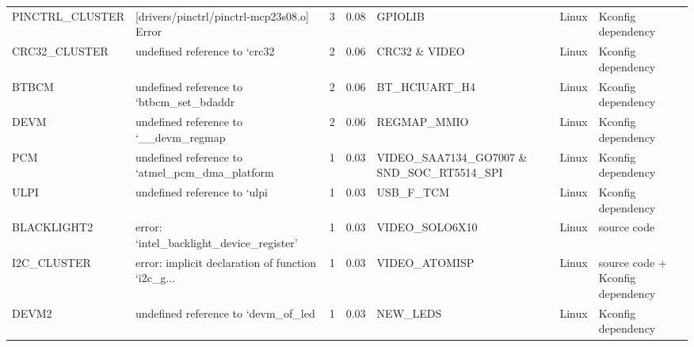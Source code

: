 \begin{tabular}{llrrlll}
    PINCTRL\_CLUSTER &         [drivers/pinctrl/pinctrl-mcp23s08.o] Error &            3 &        0.08 &                                           GPIOLIB  &  Linux &                Kconfig dependency \\
      CRC32\_CLUSTER &                      undefined reference to `crc32 &            2 &        0.06 &                                      CRC32 \& VIDEO &  Linux &                Kconfig dependency \\
              BTBCM &           undefined reference to `btbcm\_set\_bdaddr &            2 &        0.06 &                                      BT\_HCIUART\_H4 &  Linux &                Kconfig dependency \\
               DEVM &              undefined reference to `\_\_devm\_regmap &            2 &        0.06 &                                       REGMAP\_MMIO  &  Linux &                Kconfig dependency \\
                PCM &     undefined reference to `atmel\_pcm\_dma\_platform &            1 &        0.03 &         VIDEO\_SAA7134\_GO7007 \& SND\_SOC\_RT5514\_SPI  &  Linux &                Kconfig dependency \\
               ULPI &                       undefined reference to `ulpi &            1 &        0.03 &                                          USB\_F\_TCM &  Linux &                Kconfig dependency \\
        BLACKLIGHT2 &           error: ‘intel\_backlight\_device\_register’ &            1 &        0.03 &                                     VIDEO\_SOLO6X10 &  Linux &                       source code \\
        I2C\_CLUSTER &  error: implicit declaration of function ‘i2c\_g... &            1 &        0.03 &                                      VIDEO\_ATOMISP &  Linux &  source code + Kconfig dependency \\
              DEVM2 &                undefined reference to `devm\_of\_led &            1 &        0.03 &                                          NEW\_LEDS  &  Linux &                Kconfig dependency \\
\bottomrule
\end{tabular}
